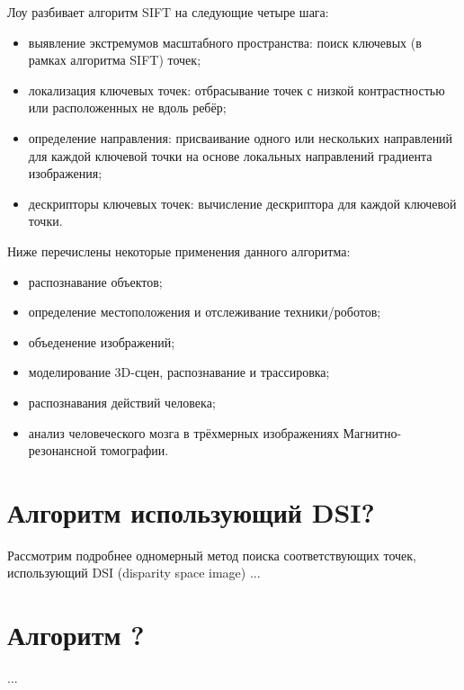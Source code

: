 Лоу разбивает алгоритм SIFT на следующие четыре шага:

\begin{itemize}
	\item выявление экстремумов масштабного пространства: поиск ключевых (в рамках алгоритма SIFT) точек;
	\item локализация ключевых точек: отбрасывание точек с низкой контрастностью или расположенных не вдоль ребёр;
	\item определение направления: присваивание одного или нескольких направлений для каждой ключевой точки на основе локальных направлений градиента изображения;
	\item дескрипторы ключевых точек: вычисление дескриптора для каждой ключевой точки.
\end{itemize}

Ниже перечислены некоторые применения данного алгоритма:

\begin{itemize}
	\item распознавание объектов;
	\item определение местоположения и отслеживание техники/роботов;
	\item объеденение изображений;
	\item моделирование 3D-сцен, распознавание и трассировка;
	\item распознавания действий человека;
	\item анализ человеческого мозга в трёхмерных изображениях Магнитно-резонансной томографии.
\end{itemize}


\section{Алгоритм использующий DSI?}
Рассмотрим подробнее одномерный метод поиска
соответствующих точек, использующий DSI (disparity
space image)
...
\section{Алгоритм ?}
...
